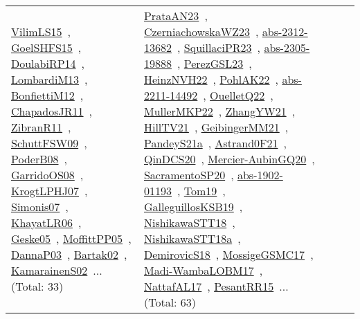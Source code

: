 {\begin{longtable}{lp{3cm}>{\raggedright\arraybackslash}p{6cm}>{\raggedright\arraybackslash}p{6cm}>{\raggedright\arraybackslash}p{8cm}}
\href{papers/VilimLS15.pdf}{VilimLS15}~\cite{VilimLS15}, \href{articles/GoelSHFS15.pdf}{GoelSHFS15}~\cite{GoelSHFS15}, \href{papers/DoulabiRP14.pdf}{DoulabiRP14}~\cite{DoulabiRP14}, \href{papers/LombardiM13.pdf}{LombardiM13}~\cite{LombardiM13}, \href{papers/BonfiettiM12.pdf}{BonfiettiM12}~\cite{BonfiettiM12}, \href{papers/ChapadosJR11.pdf}{ChapadosJR11}~\cite{ChapadosJR11}, \href{papers/ZibranR11.pdf}{ZibranR11}~\cite{ZibranR11}, \href{papers/SchuttFSW09.pdf}{SchuttFSW09}~\cite{SchuttFSW09}, \href{papers/PoderB08.pdf}{PoderB08}~\cite{PoderB08}, \href{articles/GarridoOS08.pdf}{GarridoOS08}~\cite{GarridoOS08}, \href{papers/KrogtLPHJ07.pdf}{KrogtLPHJ07}~\cite{KrogtLPHJ07}, \href{articles/Simonis07.pdf}{Simonis07}~\cite{Simonis07}, \href{articles/KhayatLR06.pdf}{KhayatLR06}~\cite{KhayatLR06}, \href{papers/Geske05.pdf}{Geske05}~\cite{Geske05}, \href{papers/MoffittPP05.pdf}{MoffittPP05}~\cite{MoffittPP05}, \href{papers/DannaP03.pdf}{DannaP03}~\cite{DannaP03}, \href{papers/Bartak02.pdf}{Bartak02}~\cite{Bartak02}, \href{papers/KamarainenS02.pdf}{KamarainenS02}~\cite{KamarainenS02}... (Total: 33) & \href{articles/PrataAN23.pdf}{PrataAN23}~\cite{PrataAN23}, \href{articles/CzerniachowskaWZ23.pdf}{CzerniachowskaWZ23}~\cite{CzerniachowskaWZ23}, \href{articles/abs-2312-13682.pdf}{abs-2312-13682}~\cite{abs-2312-13682}, \href{papers/SquillaciPR23.pdf}{SquillaciPR23}~\cite{SquillaciPR23}, \href{articles/abs-2305-19888.pdf}{abs-2305-19888}~\cite{abs-2305-19888}, \href{papers/PerezGSL23.pdf}{PerezGSL23}~\cite{PerezGSL23}, \href{articles/HeinzNVH22.pdf}{HeinzNVH22}~\cite{HeinzNVH22}, \href{articles/PohlAK22.pdf}{PohlAK22}~\cite{PohlAK22}, \href{articles/abs-2211-14492.pdf}{abs-2211-14492}~\cite{abs-2211-14492}, \href{papers/OuelletQ22.pdf}{OuelletQ22}~\cite{OuelletQ22}, \href{articles/MullerMKP22.pdf}{MullerMKP22}~\cite{MullerMKP22}, \href{articles/ZhangYW21.pdf}{ZhangYW21}~\cite{ZhangYW21}, \href{papers/HillTV21.pdf}{HillTV21}~\cite{HillTV21}, \href{papers/GeibingerMM21.pdf}{GeibingerMM21}~\cite{GeibingerMM21}, \href{articles/PandeyS21a.pdf}{PandeyS21a}~\cite{PandeyS21a}, \href{papers/Astrand0F21.pdf}{Astrand0F21}~\cite{Astrand0F21}, \href{articles/QinDCS20.pdf}{QinDCS20}~\cite{QinDCS20}, \href{papers/Mercier-AubinGQ20.pdf}{Mercier-AubinGQ20}~\cite{Mercier-AubinGQ20}, \href{articles/SacramentoSP20.pdf}{SacramentoSP20}~\cite{SacramentoSP20}, \href{articles/abs-1902-01193.pdf}{abs-1902-01193}~\cite{abs-1902-01193}, \href{papers/Tom19.pdf}{Tom19}~\cite{Tom19}, \href{papers/GalleguillosKSB19.pdf}{GalleguillosKSB19}~\cite{GalleguillosKSB19}, \href{papers/NishikawaSTT18.pdf}{NishikawaSTT18}~\cite{NishikawaSTT18}, \href{papers/NishikawaSTT18a.pdf}{NishikawaSTT18a}~\cite{NishikawaSTT18a}, \href{papers/DemirovicS18.pdf}{DemirovicS18}~\cite{DemirovicS18}, \href{papers/MossigeGSMC17.pdf}{MossigeGSMC17}~\cite{MossigeGSMC17}, \href{papers/Madi-WambaLOBM17.pdf}{Madi-WambaLOBM17}~\cite{Madi-WambaLOBM17}, \href{articles/NattafAL17.pdf}{NattafAL17}~\cite{NattafAL17}, \href{papers/PesantRR15.pdf}{PesantRR15}~\cite{PesantRR15}... (Total: 63)\\

\end{longtable}}
